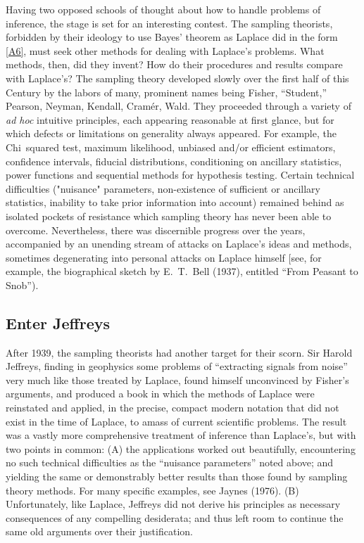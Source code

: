 Having two opposed schools of thought about how to handle problems of inference, the stage is set for an interesting contest.
The sampling theorists, forbidden by their ideology to use Bayes' theorem as Laplace did in the form \eqref{A6}, must seek other methods for dealing with Laplace's problems.
What methods, then, did they invent?
How do their procedures and results compare with Laplace's?
The sampling theory developed slowly over the first half of this Century by the labors of many, prominent names being Fisher, ``Student,'' Pearson, Neyman, Kendall, Cramér, Wald.
They proceeded through a variety of \emph{ad hoc} intuitive principles, each appearing reasonable at first glance, but for which defects or limitations on generality always appeared.
For example, the Chi~squared test, maximum likelihood, unbiased and/or efficient estimators, confidence intervals, fiducial distributions, conditioning on ancillary statistics, power functions and sequential methods for hypothesis testing.
Certain technical difficulties ("nuisance" parameters, non-existence of sufficient or ancillary statistics, inability to take prior information into account) remained behind as isolated pockets of resistance which sampling theory has never been able to overcome.
Nevertheless, there was discernible progress over the years, accompanied by an unending stream of attacks on Laplace's ideas and methods, sometimes degenerating into personal attacks on Laplace himself [see, for example, the biographical sketch by E.~T.~Bell (\cite{bell}{1937}), entitled ``From Peasant to Snob'').


\subsection*{Enter Jeffreys}
After 1939, the sampling theorists had another target for their scorn.
Sir Harold Jeffreys, finding in geophysics some problems of ``extracting signals from noise'' very much like those treated by Laplace, found himself unconvinced by Fisher's arguments, and produced a book in which the methods of Laplace were reinstated and applied, in the precise, compact modern notation that did not exist in the time of Laplace, to amass of current scientific problems.
The result was a vastly more comprehensive treatment of inference than Laplace's, but with two points in common: (A) the applications worked out beautifully, encountering no such technical difficulties as the ``nuisance parameters'' noted above; and yielding the same or demonstrably better results than those found by sampling theory methods.
For many specific examples, see Jaynes (\cite{jaynes76}{1976}). (B) Unfortunately, like Laplace, Jeffreys did not derive his principles as necessary consequences of any compelling desiderata; and thus left room to continue the same old arguments over their justification.

